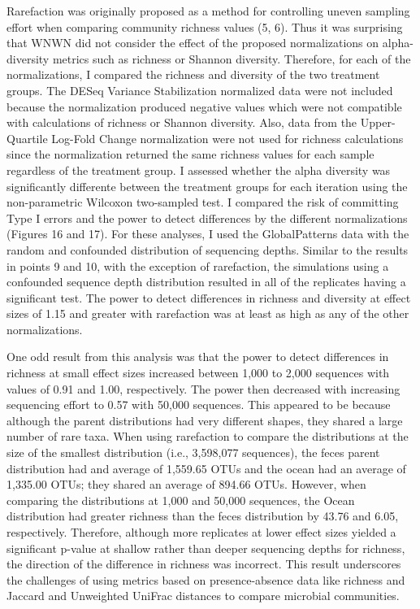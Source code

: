 \documentclass[
]{article}
\begin{document}
Rarefaction was originally proposed as a method for controlling uneven
sampling effort when comparing community richness values (5, 6). Thus it
was surprising that WNWN did not consider the effect of the proposed
normalizations on alpha-diversity metrics such as richness or Shannon
diversity. Therefore, for each of the normalizations, I compared the
richness and diversity of the two treatment groups. The DESeq Variance
Stabilization normalized data were not included because the
normalization produced negative values which were not compatible with
calculations of richness or Shannon diversity. Also, data from the
Upper-Quartile Log-Fold Change normalization were not used for richness
calculations since the normalization returned the same richness values
for each sample regardless of the treatment group. I assessed whether
the alpha diversity was significantly differente between the treatment
groups for each iteration using the non-parametric Wilcoxon two-sampled
test. I compared the risk of committing Type I errors and the power to
detect differences by the different normalizations (Figures 16 and 17).
For these analyses, I used the GlobalPatterns data with the random and
confounded distribution of sequencing depths. Similar to the results in
points 9 and 10, with the exception of rarefaction, the simulations
using a confounded sequence depth distribution resulted in all of the
replicates having a significant test. The power to detect differences in
richness and diversity at effect sizes of 1.15 and greater with
rarefaction was at least as high as any of the other normalizations.

One odd result from this analysis was that the power to detect
differences in richness at small effect sizes increased between 1,000 to
2,000 sequences with values of 0.91 and 1.00, respectively. The power
then decreased with increasing sequencing effort to 0.57 with 50,000
sequences. This appeared to be because although the parent distributions
had very different shapes, they shared a large number of rare taxa. When
using rarefaction to compare the distributions at the size of the
smallest distribution (i.e., 3,598,077 sequences), the feces parent
distribution had and average of 1,559.65 OTUs and the ocean had an
average of 1,335.00 OTUs; they shared an average of 894.66 OTUs.
However, when comparing the distributions at 1,000 and 50,000 sequences,
the Ocean distribution had greater richness than the feces distribution
by 43.76 and 6.05, respectively. Therefore, although more replicates at
lower effect sizes yielded a significant p-value at shallow rather than
deeper sequencing depths for richness, the direction of the difference
in richness was incorrect. This result underscores the challenges of
using metrics based on presence-absence data like richness and Jaccard
and Unweighted UniFrac distances to compare microbial communities.
\end{document}
